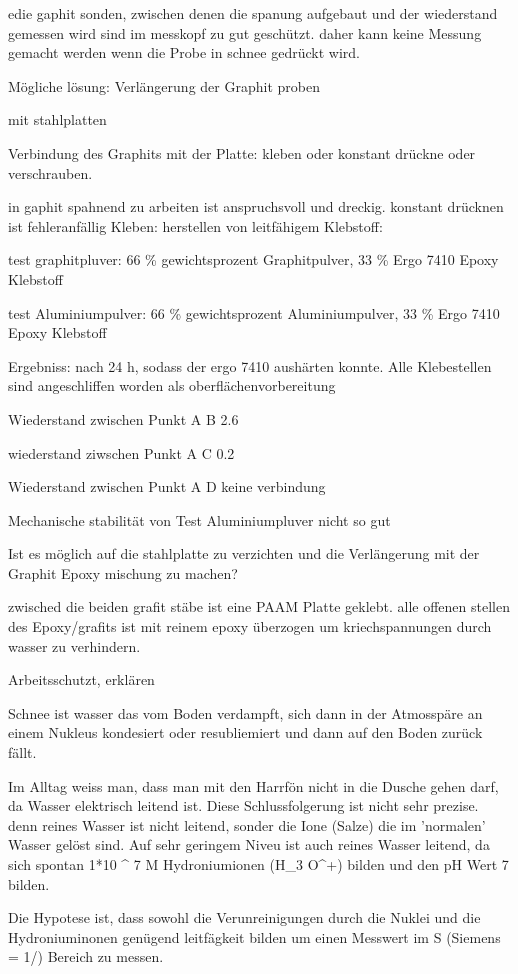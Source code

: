 \iffalse
edie gaphit sonden, zwischen denen die spanung aufgebaut und der wiederstand gemessen wird sind im messkopf zu gut geschützt. daher kann keine Messung gemacht werden wenn die Probe in schnee gedrückt wird.

Mögliche lösung: Verlängerung der Graphit proben

mit stahlplatten

Verbindung des Graphits mit der Platte: kleben oder konstant drückne oder verschrauben.

in gaphit spahnend zu arbeiten ist anspruchsvoll und dreckig.
konstant drücknen ist fehleranfällig
Kleben: herstellen von leitfähigem Klebstoff:

test graphitpluver: 66 \% gewichtsprozent Graphitpulver, 33 \% Ergo 7410 Epoxy Klebstoff

test Aluminiumpulver: 66 \% gewichtsprozent Aluminiumpulver, 33 \% Ergo 7410 Epoxy Klebstoff


Ergebniss: nach 24 h, sodass der ergo 7410 aushärten konnte.
Alle Klebestellen sind angeschliffen worden als oberflächenvorbereitung

Wiederstand zwischen Punkt A B 2.6 \ohm

wiederstand ziwschen Punkt A C 0.2 \ohm

Wiederstand zwischen Punkt A D keine verbindung

Mechanische stabilität von Test Aluminiumpluver nicht so gut

Ist es möglich auf die stahlplatte zu verzichten und die Verlängerung mit der Graphit Epoxy mischung zu machen?

zwisched die beiden grafit stäbe ist eine PAAM Platte geklebt. alle offenen stellen des Epoxy/grafits ist mit reinem epoxy überzogen um kriechspannungen durch wasser zu verhindern.

Arbeitsschutzt, erklären

Schnee ist wasser das vom Boden verdampft, sich dann in der Atmosspäre an einem Nukleus kondesiert oder resubliemiert und dann auf den Boden zurück fällt.

Im Alltag weiss man, dass man mit den Harrfön nicht in die Dusche gehen darf, da Wasser elektrisch leitend ist. Diese Schlussfolgerung ist nicht sehr prezise. denn reines Wasser ist nicht leitend, sonder die  Ione (Salze) die im 'normalen' Wasser gelöst sind. Auf sehr geringem Niveu ist auch reines Wasser leitend, da sich spontan  1*10 ^ 7 M  Hydroniumionen (H_3 O^+) bilden und den pH Wert 7 bilden.

Die Hypotese ist, dass sowohl die Verunreinigungen durch die Nuklei und die Hydroniuminonen genügend leitfägkeit bilden um einen Messwert im \mu S (Siemens = 1/\Ohm) Bereich zu messen.

